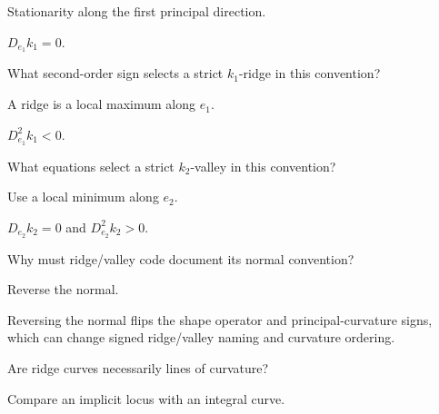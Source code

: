 \begin{hint}
Stationarity along the first principal direction.
\end{hint}

\begin{solution}
\(D_{e_1}k_1=0\).
\end{solution}

\begin{exercise}\label{exr:vii42-11}
What second-order sign selects a strict \(k_1\)-ridge in this convention?
\end{exercise}

\begin{hint}
A ridge is a local maximum along \(e_1\).
\end{hint}

\begin{solution}
\(D_{e_1}^2k_1<0\).
\end{solution}

\begin{exercise}\label{exr:vii42-12}
What equations select a strict \(k_2\)-valley in this convention?
\end{exercise}

\begin{hint}
Use a local minimum along \(e_2\).
\end{hint}

\begin{solution}
\(D_{e_2}k_2=0\) and \(D_{e_2}^2k_2>0\).
\end{solution}

\begin{exercise}\label{exr:vii42-13}
Why must ridge/valley code document its normal convention?
\end{exercise}

\begin{hint}
Reverse the normal.
\end{hint}

\begin{solution}
Reversing the normal flips the shape operator and principal-curvature signs, which can change signed ridge/valley naming and curvature ordering.
\end{solution}

\begin{exercise}\label{exr:vii42-14}
Are ridge curves necessarily lines of curvature?
\end{exercise}

\begin{hint}
Compare an implicit locus with an integral curve.
\end{hint}

